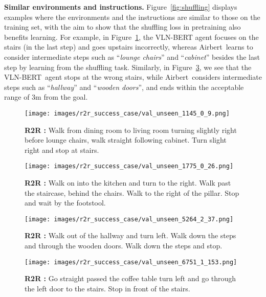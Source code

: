 \RequirePackage[dvipsnames,table]{xcolor} \documentclass[10pt,twocolumn,letterpaper]{article}
\newcommand{\p}[1]{\vspace{1mm}\noindent\textbf{#1}}
\newcommand{\vlnbert}{VLN-BERT}
\newcommand{\airbert}{Airbert}
\newcommand{\success}{{\color{ForestGreen}{\ding{52}}}}
\begin{document}
\p{Similar environments and instructions.}
Figure~\ref{fig:shuffling} displays examples where the environments and the instructions are similar to those on the training set, with the aim to show that the shuffling loss in pretraining also benefits learning.
For example, in Figure~\ref{fig:r2r-shuff1},  the VLN-BERT agent \pfinal{} focuses on the stairs (in the last step) and goes upstairs incorrectly, whereas \airbert~learns to consider intermediate steps such as ``\emph{lounge chairs}'' and ``\emph{cabinet}'' besides the last step by learning from the shuffling task.
Similarly, in Figure~\ref{fig:r2r-shuff6}, we see that the \vlnbert~agent stops at the wrong stairs, while \airbert~considers intermediate steps such as ``\emph{hallway}'' and ``\emph{wooden doors}'', and ends within the acceptable range of 3m from the goal.


\begin{figure*}[t]
    \centering
    \begin{subfigure}[b]{0.47\textwidth}
    \centering
    \texttt{[image: images/r2r\_success\_case/val\_unseen\_1145\_0\_9.png]}\caption{\textbf{R2R \success{}:} Walk from dining room to living room turning slightly right before lounge chairs, walk straight following cabinet. Turn slight right and stop at stairs.}\label{fig:r2r-shuff1}\end{subfigure}
\hfill
\begin{subfigure}[b]{0.47\textwidth}
    \centering
    \texttt{[image: images/r2r\_success\_case/val\_unseen\_1775\_0\_26.png]} 
    \caption{\textbf{R2R \success{}:} Walk on into the kitchen and turn to the right. Walk past the staircase, behind the chairs. Walk to the right of the pillar. Stop and wait by the footstool.}\label{fig:r2r-shuff3}\end{subfigure}

\begin{subfigure}[b]{0.47\textwidth}
    \centering
    \texttt{[image: images/r2r\_success\_case/val\_unseen\_5264\_2\_37.png]} 
    \caption{\textbf{R2R \success{}:} Walk out of the hallway and turn left. Walk down the steps and through the wooden doors. Walk down the steps and stop.}\label{fig:r2r-shuff6}\end{subfigure}
\hfill
\begin{subfigure}[b]{0.47\textwidth}
    \centering
    \texttt{[image: images/r2r\_success\_case/val\_unseen\_6751\_1\_153.png]} 
    \caption{\textbf{R2R \success{}:} Go straight passed the coffee table turn left and go through the left door to the stairs. Stop in front of the stairs.}\label{fig:r2r-shuff10}\end{subfigure} 


\caption{Examples in similar environments and instructions to the training set. The improvements of \airbert~model can be contributed to the shuffling loss in pretraining.}
\label{fig:shuffling}
\end{figure*}
\end{document}
